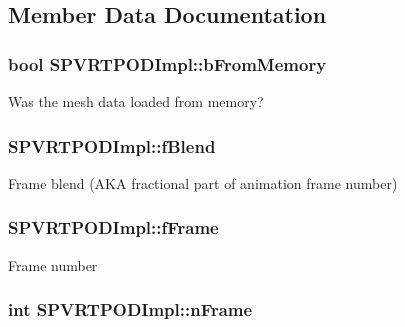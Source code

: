 \subsection{Member Data Documentation}
\hypertarget{struct_s_p_v_r_t_p_o_d_impl_af7ca0be82a1ef1d0ea06b80f03194f84}{
\subsubsection[{b\+From\+Memory}]{\setlength{\rightskip}{0pt plus 5cm}bool S\+P\+V\+R\+T\+P\+O\+D\+Impl\+::b\+From\+Memory}}\label{struct_s_p_v_r_t_p_o_d_impl_af7ca0be82a1ef1d0ea06b80f03194f84}
Was the mesh data loaded from memory? \hypertarget{struct_s_p_v_r_t_p_o_d_impl_aed4ac6d8a9fd291fb76de79c96d7de25}{
\subsubsection[{f\+Blend}]{ S\+P\+V\+R\+T\+P\+O\+D\+Impl\+::f\+Blend}}\label{struct_s_p_v_r_t_p_o_d_impl_aed4ac6d8a9fd291fb76de79c96d7de25}
Frame blend (A\+K\+A fractional part of animation frame number) \hypertarget{struct_s_p_v_r_t_p_o_d_impl_a48b1c6f0eb7c1611b698f3509179e8d1}{
\subsubsection[{f\+Frame}]{ S\+P\+V\+R\+T\+P\+O\+D\+Impl\+::f\+Frame}}\label{struct_s_p_v_r_t_p_o_d_impl_a48b1c6f0eb7c1611b698f3509179e8d1}
Frame number \hypertarget{struct_s_p_v_r_t_p_o_d_impl_a7a037b06b36243a80519a0f2dd0dfd48}{
\subsubsection[{n\+Frame}]{\setlength{\rightskip}{0pt plus 5cm}int S\+P\+V\+R\+T\+P\+O\+D\+Impl\+::n\+Frame}}\label{struct_s_p_v_r_t_p_o_d_impl_a7a037b06b36243a80519a0f2dd0dfd48}
